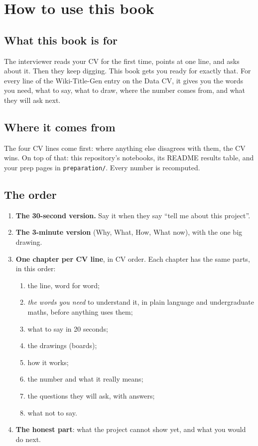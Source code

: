 \chapter{How to use this book}

\section*{What this book is for}
The interviewer reads your CV for the first time, points at one line, and asks about it. Then they keep digging. This book gets you ready for exactly that. For every line of the Wiki-Title-Gen entry on the Data CV, it gives you the words you need, what to say, what to draw, where the number comes from, and what they will ask next.

\section*{Where it comes from}
The four CV lines come first: where anything else disagrees with them, the CV wins. On top of that: this repository's notebooks, its README results table, and your prep pages in \texttt{preparation/}. Every number is recomputed.

\section*{The order}
\begin{enumerate}
  \item \textbf{The 30-second version.} Say it when they say ``tell me about this project''.
  \item \textbf{The 3-minute version} (Why, What, How, What now), with the one big drawing.
  \item \textbf{One chapter per CV line}, in CV order. Each chapter has the same parts, in this order:
  \begin{enumerate}
    \item the line, word for word;
    \item \emph{the words you need} to understand it, in plain language and undergraduate maths, before anything uses them;
    \item what to say in 20 seconds;
    \item the drawings (boards);
    \item how it works;
    \item the number and what it really means;
    \item the questions they will ask, with answers;
    \item what not to say.
  \end{enumerate}
  \item \textbf{The honest part}: what the project cannot show yet, and what you would do next.
\end{enumerate}


